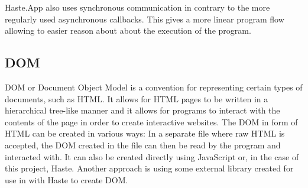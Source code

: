 \documentclass[a4paper]{article}
\begin{document}
Haste.App also uses synchronous communication in contrary to the more regularly used asynchronous callbacks.
This gives a more linear program flow allowing to easier reason about about the execution of the program.

\subsection{DOM}
DOM or Document Object Model is a convention for representing certain types of documents, such as HTML. It allows for HTML pages to be written in a hierarchical tree-like manner and it allows for programs to interact with the contents of the page in order to create interactive websites. The DOM in form of HTML can be created in various ways: In a separate file where raw HTML is accepted, the DOM created in the file can then be read by the program and interacted with. It can also be created directly using JavaScript or, in the case of this project, Haste. Another approach is using some external library created for use in with Haste to create DOM.
\end{document}
